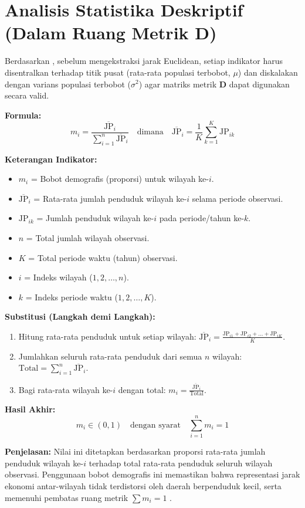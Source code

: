 \documentclass[11pt,a4paper]{article}
\begin{document}
\newpage

\section{Analisis Statistika Deskriptif (Dalam Ruang Metrik \texorpdfstring{$\mathbf{D}$}{D})}
Berdasarkan \citet{lavit94}, sebelum mengekstraksi jarak Euclidean, setiap indikator harus disentralkan terhadap titik pusat (rata-rata populasi terbobot, $\mu$) dan diskalakan dengan varians populasi terbobot ($\sigma^2$) agar matriks metrik $\mathbf{D}$ dapat digunakan secara valid.
\begin{tcolorbox}[formula_box, title={Bobot}] \label{kotak:bobot}
\textbf{Formula:}
\[
m_i = \frac{\overline{\text{JP}}_i}{\sum_{i=1}^{n} \overline{\text{JP}}_i} \quad \text{dimana} \quad \overline{\text{JP}}_i = \frac{1}{K}\sum_{k=1}^{K} \text{JP}_{ik}
\]

\textbf{Keterangan Indikator:}
\begin{itemize}
    \item $m_i$ = Bobot demografis (proporsi) untuk wilayah ke-$i$.
    \item $\overline{\text{JP}}_i$ = Rata-rata jumlah penduduk wilayah ke-$i$ selama periode observasi.
    \item $\text{JP}_{ik}$ = Jumlah penduduk wilayah ke-$i$ pada periode/tahun ke-$k$.
    \item $n$ = Total jumlah wilayah observasi.
    \item $K$ = Total periode waktu (tahun) observasi.
    \item $i$ = Indeks wilayah ($1, 2, \dots, n$).
    \item $k$ = Indeks periode waktu ($1, 2, \dots, K$).
\end{itemize}

\textbf{Substitusi (Langkah demi Langkah):}
\begin{enumerate}
    \item Hitung rata-rata penduduk untuk setiap wilayah: $\overline{\text{JP}}_i = \frac{\text{JP}_{i1} + \text{JP}_{i2} + \dots + \text{JP}_{iK}}{K}$.
    \item Jumlahkan seluruh rata-rata penduduk dari semua $n$ wilayah: $\text{Total} = \sum_{i=1}^{n} \overline{\text{JP}}_i$.
    \item Bagi rata-rata wilayah ke-$i$ dengan total: $m_i = \frac{\overline{\text{JP}}_i}{\text{Total}}$.
\end{enumerate}

\textbf{Hasil Akhir:}
\[
m_i \in (0, 1) \quad \text{dengan syarat} \quad \sum_{i=1}^{n} m_i = 1
\]

\textbf{Penjelasan:} Nilai ini ditetapkan berdasarkan proporsi rata-rata jumlah penduduk wilayah ke-$i$ terhadap total rata-rata penduduk seluruh wilayah observasi. Penggunaan bobot demografis ini memastikan bahwa representasi jarak ekonomi antar-wilayah tidak terdistorsi oleh daerah berpenduduk kecil, serta memenuhi pembatas ruang metrik $\sum m_i = 1$ \citet{lavit94}.
\end{tcolorbox}
\end{document}
